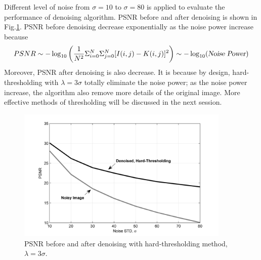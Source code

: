 \documentclass[11pt]{article}
\begin{document}
Different level of noise from $\sigma = 10$ to $\sigma = 80$ is applied to evaluate the performance of denoising algorithm. PSNR before and after denoising is shown in Fig.\ref{Fig_PSNR_vs_sigma_HardThresholding}. PSNR before denoising decrease exponentially as the noise power increase because $$PSNR \sim - \log_{10}{\left(\frac{1}{N^2} \Sigma_{i=0}^N \Sigma_{j=0}^N [I(i, j) - K(i, j)]^2 \right)} \sim -\log_{10}(\textsl{Noise Power})$$ 
Moreover, PSNR after denoising is also decrease. It is because by design, hard-thresholding with $\lambda = 3\sigma$ totally eliminate the noise power; as the noise power increase, the algorithm also remove more details of the original image. More effective methods of thresholding will be discussed in the next session.  

\begin{figure}[H]
	\centering
	\includegraphics[trim=0.5in 0.1in 0.5in 0in, width=4in]{Fig_PSNR_vs_sigma_HardThresholding.png}
	\caption{PSNR before and after denoising with hard-thresholding method, $\lambda = 3\sigma$.}
	\label{Fig_PSNR_vs_sigma_HardThresholding}
\end{figure}

\end{document}
